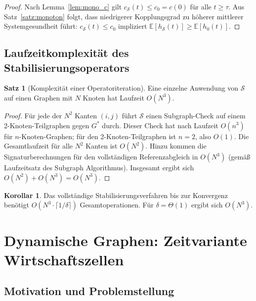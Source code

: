 \documentclass[a4paper, 12pt, twoside, openright]{report}
\theoremstyle{definition}
\theoremstyle{definition}
\newtheorem{satz}{Satz}[chapter]
\newtheorem{korollar}{Korollar}[chapter]
\begin{document}
\begin{proof}
    Nach Lemma~\ref{lem:mono_c} gilt $c_{\mathcal{S}}(t) \leq c_0 = c(0)$ für alle
    $t \geq \tau$. Aus Satz~\ref{satz:monoton} folgt, dass niedrigerer Kopplungsgrad
    zu höherer mittlerer Systemgesundheit führt: $c_{\mathcal{S}}(t) \leq c_0$ impliziert
    $\mathbb{E}[h_{\mathcal{S}}(t)] \geq \mathbb{E}[h_0(t)]$.
\end{proof}

\subsection{Laufzeitkomplexität des Stabilisierungsoperators}

\begin{satz}[Komplexität einer Operatoriteration]
\label{satz:komplex_op}
    Eine einzelne Anwendung von $\mathcal{S}$ auf einen Graphen mit $N$ Knoten hat
    Laufzeit $O(N^3)$.
\end{satz}

\begin{proof}
    Für jede der $N^2$ Kanten $(i,j)$ führt $\mathcal{S}$ einen Subgraph-Check
    auf einem 2-Knoten-Teilgraphen gegen $G^*$ durch. Dieser Check hat nach
    \citep{epp2026subgraph} Laufzeit $O(n^3)$ für $n$-Knoten-Graphen; für
    den 2-Knoten-Teilgraphen ist $n=2$, also $O(1)$. Die Gesamtlaufzeit für
    alle $N^2$ Kanten ist $O(N^2)$. Hinzu kommen die Signaturberechnungen
    für den vollständigen Referenzabgleich in $O(N^3)$ (gemäß Laufzeitsatz des
    Subgraph Algorithmus). Insgesamt ergibt sich $O(N^2) + O(N^3) = O(N^3)$.
\end{proof}

\begin{korollar}
    Das vollständige Stabilisierungsverfahren bis zur Konvergenz benötigt
    $O(N^3 \cdot \lceil 1/\delta \rceil)$ Gesamtoperationen. Für $\delta = \Theta(1)$
    ergibt sich $O(N^3)$.
\end{korollar}

\section{Dynamische Graphen: Zeitvariante Wirtschaftszellen}
\label{sec:dynGraph}

\subsection{Motivation und Problemstellung}
\end{document}
